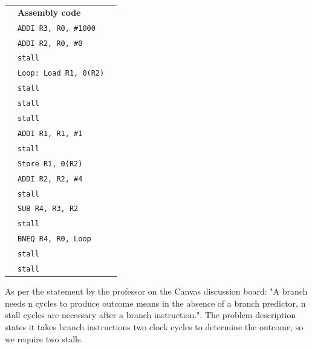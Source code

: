 \documentclass[a4paper, 11pt]{exam}
\begin{document}
\begin{enumerate}
\begin{enumerate}
\begin{tabular}{lll}
	& \textbf{Assembly code }\\
	&\hspace{40pt}\texttt{ADDI R3, R0, \#1000} \\
	&\hspace{40pt}\texttt{ADDI R2, R0, \#0}\\
	&\hspace{40pt}\texttt{stall}\\
	&\texttt{Loop: Load  R1, 0(R2)} \\
	&\hspace{40pt}\texttt{stall}\\
	&\hspace{40pt}\texttt{stall}\\
	&\hspace{40pt}\texttt{stall}\\
	&\hspace{40pt}\texttt{ADDI   R1, R1, \#1}\\
	&\hspace{40pt}\texttt{stall}\\
	&\hspace{40pt}\texttt{Store  R1, 0(R2)}\\
	&\hspace{40pt}\texttt{ADDI R2, R2, \#4}\\
	&\hspace{40pt}\texttt{stall}\\
	&\hspace{40pt}\texttt{SUB R4, R3, R2}\\
	&\hspace{40pt}\texttt{stall}\\
	&\hspace{40pt}\texttt{BNEQ R4, R0, Loop}\\
	&\hspace{40pt}\texttt{stall}\\
	&\hspace{40pt}\texttt{stall}\\
\end{tabular}


\hfill

As per the statement by the professor on the Canvas discussion board: "A branch needs n cycles to produce outcome means in the absence of a branch predictor, n stall cycles are necessary after a branch instruction.". The problem description states it takes branch instructions two clock cycles to determine the outcome, so we require two stalls.


\end{enumerate}
\end{enumerate}
\end{document}

